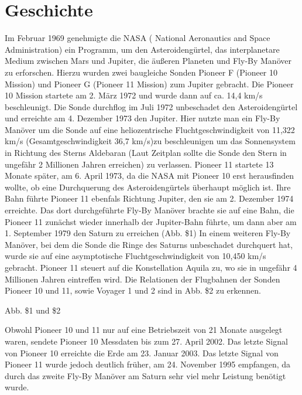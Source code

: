 
\section{Geschichte}

Im Februar 1969 genehmigte die NASA ( National Aeronautics and Space
Administration) ein Programm, um den Asteroideng\"urtel, das
interplanetare Medium zwischen Mars und Jupiter, die \"au{\ss}eren
Planeten und Fly-By Man\"over zu erforschen. Hierzu wurden zwei
baugleiche Sonden Pioneer F (Pioneer 10 Mission) und Pioneer G (Pioneer
11 Mission) zum Jupiter gebracht. Die Pioneer 10 Mission startete am 2.
M\"arz 1972 und wurde dann auf ca. 14,4 km/s beschleunigt. Die Sonde
durchflog im Juli 1972 unbeschadet den Asteroideng\"urtel und erreichte
am 4. Dezember 1973 den Jupiter. Hier nutzte man ein Fly-By Man\"over
um die Sonde auf eine heliozentrische Fluchtgeschwindigkeit von 11,322
km/s (Gesamtgeschwindigkeit 36,7 km/s)zu beschleunigen um das
Sonnensystem in Richtung des Sterns Aldebaran (Laut Zeitplan sollte die
Sonde den Stern in ungef\"ahr 2 Millionen Jahren erreichen\cite{Nieto2007}) zu verlassen. Pioneer
11 startete 13 Monate sp\"ater, am 6. April 1973, da die NASA mit
Pioneer 10 erst herausfinden wollte, ob eine Durchquerung des
Asteroideng\"urtels \"uberhaupt m\"oglich ist. Ihre Bahn f\"uhrte
Pioneer 11 ebenfals Richtung Jupiter, den sie am 2. Dezember 1974
erreichte. Das dort durchgef\"uhrte Fly-By Man\"over brachte sie auf
eine Bahn, die Pioneer 11 zun\"achst wieder innerhalb der Jupiter-Bahn
f\"uhrte, um dann aber am 1. September 1979 den Saturn zu erreichen
(Abb. \$1) In einem weiteren Fly-By Man\"over, bei dem die Sonde die
Ringe des Saturns unbeschadet durchquert hat, wurde sie auf eine
asymptotische Fluchtgeschwindigkeit von 10,450 km/s gebracht. Pioneer
11 steuert auf die Konstellation Aquila zu, wo sie in ungef\"ahr 4
Millionen Jahren eintreffen wird. Die Relationen der Flugbahnen der
Sonden Pioneer 10 und 11, sowie Voyager 1 und 2 sind in Abb. \$2 zu
erkennen.


\bigskip

Abb. \$1 und \$2


\bigskip

Obwohl Pioneer 10 und 11 nur auf eine Betriebszeit von 21 Monate
ausgelegt waren, sendete Pioneer 10 Messdaten bis zum 27. April 2002.
Das letzte Signal von Pioneer 10 erreichte die Erde am 23. Januar 2003.
Das letzte Signal von Pioneer 11 wurde jedoch deutlich fr\"uher, am 24.
November 1995 empfangen, da durch das zweite Fly-By Man\"over am Saturn
sehr viel mehr Leistung ben\"otigt wurde.

